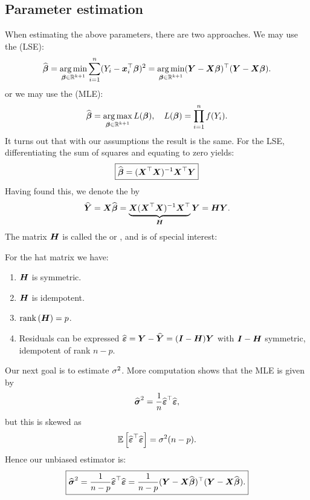 \subsection{Parameter estimation}
When estimating the above parameters, there are two approaches. We may use the  (LSE): 
$$
    \Bh 
    = \argmin_{\B\in\R^{k+1}} \sum_{i=1}^n (Y_i-\x_i^\top\B)^2
    = \argmin_{\B\in\R^{k+1}} (\Y-\X\B)^\top(\Y-\X\B).
$$
or we may use the  (MLE):
$$
    \Bh 
    = \argmax_{\B\in\R^{k+1}} L(\B), \quad L(\B) = \prod_{i=1}^n f(Y_i).
$$
It turns out that with our assumptions the result is the same. For the LSE, differentiating the sum of squares and equating to zero yields:
\begin{equation}
    \boxed{\Bh = (\X^\top\X)^{-1}\X^\top\Y }
\end{equation}
Having found this, we denote the  by 
$$
    \hat{\Y} = \X\Bh = \underbrace{\X(\X^\top \X)^{-1}\X^\top}_{\mH}\Y = \mH\Y.
$$
The matrix $\mH$ is called the  or , and is of special interest:
\begin{proposition}
    For the hat matrix we have:
    \begin{enumerate}
        \item $\mH$ is symmetric.
        \item $\mH$ is idempotent.
        \item $\rank{\mH} = p$.
        \item Residuals can be expressed $\Eh=\Y-\hat{\Y} = (\mI-\mH)\Y$ with $\mI-\mH$ symmetric, idempotent of rank $n-p$.
    \end{enumerate}
\end{proposition}
Our next goal is to estimate $\s^2$. More computation shows that the MLE is given by 
$$
    \Sh^2 = \frac{1}{n}\Eh^\top\Eh,
$$ 
but this is skewed as 
$$
    \ev{\Eh^\top\Eh}=\s^2(n-p).
$$
Hence our unbiased estimator is:
\begin{equation}
    \boxed{
        \Sh^2 = \frac{1}{n-p}\Eh^\top\Eh = \frac{1}{n-p}(\Y-\X\hat{\B})^\top(\Y-\X\hat{\B}).
    }    
\end{equation}


